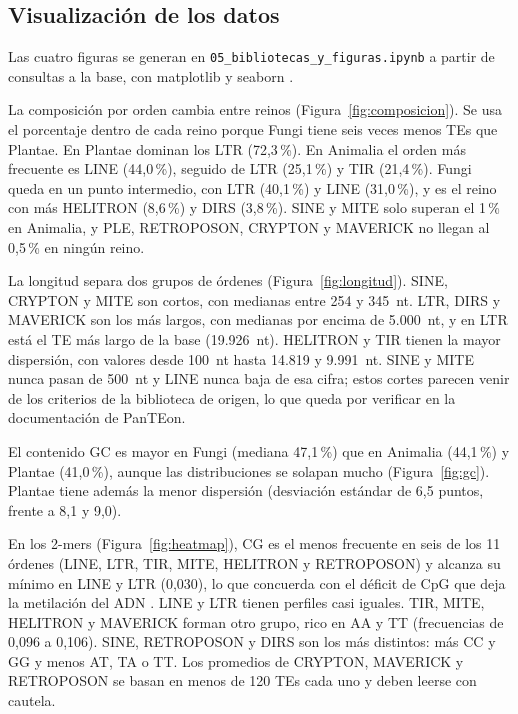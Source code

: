 \documentclass[unnumsec,namedate,webpdf,contemporary,large]{oup-authoring-template}
\begin{document}
\subsection{Visualizaci\'on de los datos}

Las cuatro figuras se generan en \texttt{05\_bibliotecas\_y\_figuras.ipynb} a partir de consultas a la base, con matplotlib \citep{hunter2007matplotlib} y seaborn \citep{waskom2021seaborn}.

La composici\'on por orden cambia entre reinos (Figura~\ref{fig:composicion}). Se usa el porcentaje dentro de cada reino porque Fungi tiene seis veces menos TEs que Plantae. En Plantae dominan los LTR (72,3\,\%). En Animalia el orden m\'as frecuente es LINE (44,0\,\%), seguido de LTR (25,1\,\%) y TIR (21,4\,\%). Fungi queda en un punto intermedio, con LTR (40,1\,\%) y LINE (31,0\,\%), y es el reino con m\'as HELITRON (8,6\,\%) y DIRS (3,8\,\%). SINE y MITE solo superan el 1\,\% en Animalia, y PLE, RETROPOSON, CRYPTON y MAVERICK no llegan al 0,5\,\% en ning\'un reino.

La longitud separa dos grupos de \'ordenes (Figura~\ref{fig:longitud}). SINE, CRYPTON y MITE son cortos, con medianas entre 254 y 345~nt. LTR, DIRS y MAVERICK son los m\'as largos, con medianas por encima de 5.000~nt, y en LTR est\'a el TE m\'as largo de la base (19.926~nt). HELITRON y TIR tienen la mayor dispersi\'on, con valores desde 100~nt hasta 14.819 y 9.991~nt. SINE y MITE nunca pasan de 500~nt y LINE nunca baja de esa cifra; estos cortes parecen venir de los criterios de la biblioteca de origen, lo que queda por verificar en la documentaci\'on de PanTEon.

El contenido GC es mayor en Fungi (mediana 47,1\,\%) que en Animalia (44,1\,\%) y Plantae (41,0\,\%), aunque las distribuciones se solapan mucho (Figura~\ref{fig:gc}). Plantae tiene adem\'as la menor dispersi\'on (desviaci\'on est\'andar de 6,5 puntos, frente a 8,1 y 9,0).

En los 2-mers (Figura~\ref{fig:heatmap}), CG es el menos frecuente en seis de los 11 \'ordenes (LINE, LTR, TIR, MITE, HELITRON y RETROPOSON) y alcanza su m\'inimo en LINE y LTR (0,030), lo que concuerda con el d\'eficit de CpG que deja la metilaci\'on del ADN \citep{bird1980dna}. LINE y LTR tienen perfiles casi iguales. TIR, MITE, HELITRON y MAVERICK forman otro grupo, rico en AA y TT (frecuencias de 0,096 a 0,106). SINE, RETROPOSON y DIRS son los m\'as distintos: m\'as CC y GG y menos AT, TA o TT. Los promedios de CRYPTON, MAVERICK y RETROPOSON se basan en menos de 120 TEs cada uno y deben leerse con cautela.
\end{document}
